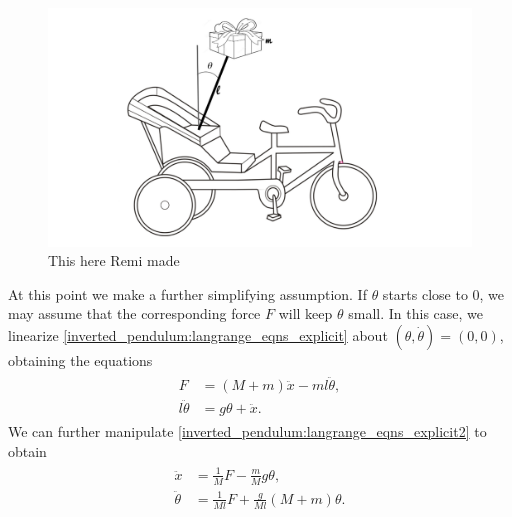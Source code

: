 \begin{figure}
\centering
\includegraphics[width=\textwidth]{rickshaw_img.png}
\caption{This here Remi made}
\label{fig:inverted_pendulum:rickshaw_diagram}
\end{figure}


At this point we make a further simplifying assumption. 
If $\theta$ starts close to $0$, we may assume that the corresponding force $F$ will keep $\theta$ small. 
In this case, we linearize \eqref{inverted_pendulum:langrange_eqns_explicit} about $(\theta, \dot{\theta}) = (0,0)$, obtaining the equations 
\begin{align}
	\begin{split}
		F &= (M + m)\ddot{x} - ml\ddot{\theta},\\
		l \ddot{\theta} &= g \theta + \ddot{x}.
	\end{split}\label{inverted_pendulum:langrange_eqns_explicit2}
\end{align}
We can further manipulate \eqref{inverted_pendulum:langrange_eqns_explicit2} to obtain 
\begin{align}
	\begin{split}
		\ddot{x} &= \frac{1}{M}F - \frac{m}{M}g\theta,\\
		\ddot{\theta} &= \frac{1}{Ml}F + \frac{g}{Ml} (M+m) \theta.
	\end{split}\label{inverted_pendulum:langrange_eqns_explicit3}
\end{align}

